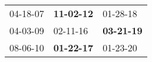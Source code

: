 \begin{supertabular}{p{0.33\columnwidth}p{0.33\columnwidth}p{0.33\columnwidth}}
 04-18-07\textsuperscript{} &  \textbf{11-02-12\textsuperscript{}} &           01-28-18\textsuperscript{} \\
 04-03-09\textsuperscript{} &           02-11-16\textsuperscript{} &  \textbf{03-21-19\textsuperscript{}} \\
 08-06-10\textsuperscript{} &  \textbf{01-22-17\textsuperscript{}} &           01-23-20\textsuperscript{} \\
\end{supertabular}
